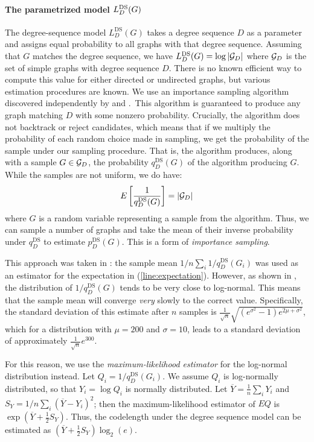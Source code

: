 \paragraph{The parametrized model $L^\textnormal{DS}_D(G)$} The degree-sequence model $L^\text{DS}_D(G)$ takes a degree sequence $D$ as a parameter and assigns equal probability to all graphs with that degree sequence. Assuming that $G$ matches the degree sequence, we have $L^\text{DS}_D(G) = \log |{\mathcal G}_D|$ where ${\mathcal G}_D$ is the set of simple graphs with degree sequence $D$. There is no known efficient way to compute this value for either directed or undirected graphs, but various estimation procedures are known. We use an importance sampling algorithm discovered independently by \cite{blitzstein2011sequential} and \cite{charo2010efficient}.\footnotemark~This algorithm is guaranteed to produce any graph matching $D$ with some nonzero probability. Crucially, the algorithm does not backtrack or reject candidates, which means that if we multiply the probability of each random choice made in sampling, we get the probability of the sample under our sampling procedure. That is, the algorithm produces, along with a sample $G \in {\mathcal G}_D$, the probability $q^\text{DS}_D(G)$ of the algorithm producing $G$. While the samples are not uniform, we do have:
\begin{equation}
{E} \left [\frac{1}{q^\text{DS}_D(G)}\right] = |{\mathcal G}_D| \label{line:expectation}
\end{equation}
where $G$ is a random variable representing a sample from the algorithm. Thus, we can sample a number of graphs and take the mean of their inverse probability under $q^\text{DS}_D$ to estimate $p^\text{DS}_D(G)$. This is a form of \emph{importance sampling}. 

This approach was taken in \cite{blitzstein2011sequential}: the sample mean $1/n \sum_i 1/q^\text{DS}_D(G_i)$ was used as an estimator for the expectation in (\ref{line:expectation}). However, as shown in \cite{charo2010efficient}, the distribution of $1/q^\text{DS}_D(G)$ tends to be very close to log-normal. This means that the sample mean will converge \emph{very} slowly to the correct value. Specifically, the standard deviation of this estimate after $n$ samples is $\frac{1}{\sqrt{n}} \sqrt{(e^{\sigma^2}-1)e^{2\mu +\sigma^2}}$, which for a distribution with $\mu=200$ and $\sigma=10$, leads to a standard deviation of approximately $\frac{1}{\sqrt{n}} e^{300}$.

For this reason, we use the \emph{maximum-likelihood estimator} for the log-normal distribution instead. Let $Q_i = 1/q^\text{DS}_{D}(G_i)$. We assume $Q_i$ is log-normally distributed, so that $Y_i = \log Q_i$ is normally distributed. Let $\overline{Y} = \frac{1}{n}\sum_i Y_i$ and $S_Y = 1/n \sum_i (\overline{Y} - Y_i)^2$; then the maximum-likelihood estimator of $EQ$ is $\exp\left(\overline{Y} + \frac{1}{2}S_Y\right)$. Thus, the codelength under the degree sequence model can be estimated as $\left(\overline{Y} + \frac{1}{2}S_Y\right)\log_2(e)$.

